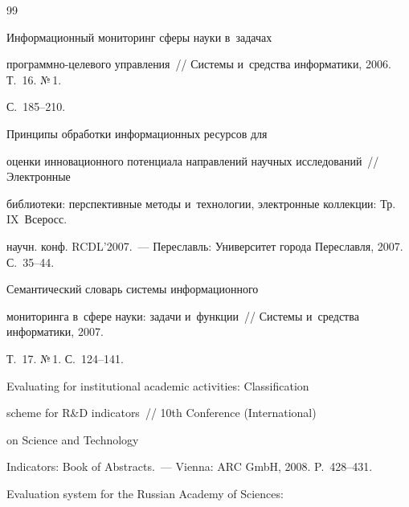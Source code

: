 {\small\frenchspacing


{%




\begin{thebibliography}{99}





\vspace*{-2pt}







 Информационный мониторинг сферы науки в~задачах 


программно-целевого управления~/\!\!/ Системы и~средства информатики, 2006. Т.~16. №\,1. 


С.~185--210.




 Принципы обработки информационных ресурсов для 


оценки инновационного потенциала направлений научных исследований~/\!\!/ Электронные 


библиотеки: перспективные методы и~технологии, электронные коллекции: Тр. IX~Всеросс. 


научн. конф. RCDL'2007.~--- Переславль: Университет города Переславля, 2007. С.~35--44.




 Семантический словарь системы информационного 


мониторинга в~сфере науки: задачи и~функции~/\!\!/ Системы и~средства информатики, 2007. 


Т.~17. №\,1. С.~124--141.







 Evaluating for institutional academic activities: Classification 


scheme for R\&D indicators~/\!\!/ 10th Conference (International) 


on Science and Technology 


Indicators: Book of Abstracts.~--- Vienna: ARC GmbH, 2008. P.~428--431.




 Evaluation system for the Russian Academy of Sciences: 



\end{thebibliography}}}
